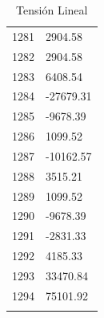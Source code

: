 \documentclass[a4paper,11pt]{article}
\begin{document}
\begin{center}
\begin{longtable}{|R{1.5cm}|R{2.6cm}|}
 1281 &      2904.58 \\
 1282 &      2904.58 \\
 1283 &      6408.54 \\
 1284 &    -27679.31 \\
 1285 &     -9678.39 \\
 1286 &      1099.52 \\
 1287 &    -10162.57 \\
 1288 &      3515.21 \\
 1289 &      1099.52 \\
 1290 &     -9678.39 \\
 1291 &     -2831.33 \\
 1292 &      4185.33 \\
 1293 &     33470.84 \\
 1294 &     75101.92 \\
\bottomrule[0.8mm]                               
\caption{Tensión Lineal}             
\end{longtable}                                  
\end{center}                                     
\end{document}

